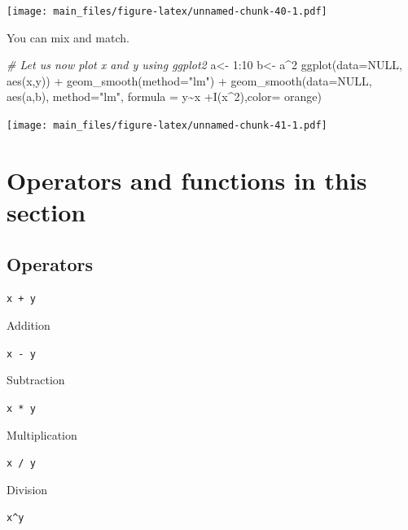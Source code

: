 \documentclass[
]{book}
\newenvironment{Shaded}{\begin{snugshade}}{\end{snugshade}}
\newcommand{\AttributeTok}[1]{\textcolor[rgb]{0.77,0.63,0.00}{#1}}
\newcommand{\CommentTok}[1]{\textcolor[rgb]{0.56,0.35,0.01}{\textit{#1}}}
\newcommand{\ConstantTok}[1]{\textcolor[rgb]{0.00,0.00,0.00}{#1}}
\newcommand{\DecValTok}[1]{\textcolor[rgb]{0.00,0.00,0.81}{#1}}
\newcommand{\FunctionTok}[1]{\textcolor[rgb]{0.00,0.00,0.00}{#1}}
\newcommand{\NormalTok}[1]{#1}
\newcommand{\OtherTok}[1]{\textcolor[rgb]{0.56,0.35,0.01}{#1}}
\newcommand{\SpecialCharTok}[1]{\textcolor[rgb]{0.00,0.00,0.00}{#1}}
\newcommand{\StringTok}[1]{\textcolor[rgb]{0.31,0.60,0.02}{#1}}
\begin{document}
\texttt{[image: main\_files/figure-latex/unnamed-chunk-40-1.pdf]}

You can mix and match.

\begin{Shaded}
\begin{Highlighting}[]
\CommentTok{\# Let us now plot x and y using ggplot2}
\NormalTok{a}\OtherTok{\textless{}{-}} \DecValTok{1}\SpecialCharTok{:}\DecValTok{10}
\NormalTok{b}\OtherTok{\textless{}{-}}\NormalTok{ a}\SpecialCharTok{\^{}}\DecValTok{2}
\FunctionTok{ggplot}\NormalTok{(}\AttributeTok{data=}\ConstantTok{NULL}\NormalTok{, }\FunctionTok{aes}\NormalTok{(x,y)) }\SpecialCharTok{+}
  \FunctionTok{geom\_smooth}\NormalTok{(}\AttributeTok{method=}\StringTok{"lm"}\NormalTok{) }\SpecialCharTok{+}
  \FunctionTok{geom\_smooth}\NormalTok{(}\AttributeTok{data=}\ConstantTok{NULL}\NormalTok{, }\FunctionTok{aes}\NormalTok{(a,b), }\AttributeTok{method=}\StringTok{"lm"}\NormalTok{, }\AttributeTok{formula =}\NormalTok{ y}\SpecialCharTok{\textasciitilde{}}\NormalTok{x }\SpecialCharTok{+}\FunctionTok{I}\NormalTok{(x}\SpecialCharTok{\^{}}\DecValTok{2}\NormalTok{),}\AttributeTok{color=} \StringTok{\textquotesingle{}orange\textquotesingle{}}\NormalTok{) }
\end{Highlighting}
\end{Shaded}

\texttt{[image: main\_files/figure-latex/unnamed-chunk-41-1.pdf]}

\hypertarget{operators-and-functions-in-this-section}{%
\section{Operators and functions in this section}\label{operators-and-functions-in-this-section}}

\hypertarget{operators-1}{%
\subsection{Operators}\label{operators-1}}

\texttt{x\ +\ y}

Addition

\texttt{x\ -\ y}

Subtraction

\texttt{x\ *\ y}

Multiplication

\texttt{x\ /\ y}

Division

\texttt{x\^{}y}
\end{document}
